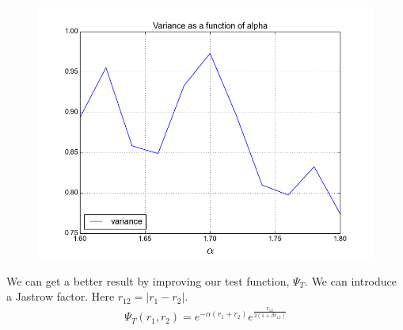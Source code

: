 \documentclass[a4paper, 12pt, titlepage]{article}
\begin{document}
 \begin{figure}[H]
 	\centering
 	\includegraphics[width=\textwidth]{../python_programs/EnergyVariance_helium3.png}
 \end{figure}

 We can get a better result by improving our test function, $\Psi_T$. We can introduce a Jastrow factor. Here $r_{12} = |r_1 - r_2|$. 
 \begin{align*}
 	\Psi_T(r_1,r_2) = e^{-\alpha(r_1 + r_2)}e^{\frac{r_{12}}{2(1+\beta r_{12})}}
 \end{align*}
 
\end{document}
